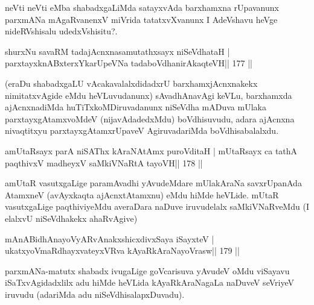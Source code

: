 \begin{artha}
neVti neVti eMba shabadxgaLiMda satayxvAda barxhamxna rUpavanunx parxmANa mAgaRvanenxV miVrida tatatxvXvanunx I AdeVshavu heVge nideRVshisalu udedxVshisitu?.
\end{artha}

\begin{shl}
shurxNu savaRM tadajAcnxnasamutathxsayx niSeVdhataH |
parxtayxknABxterxYkarUpeVNa tadaboVdhanirAkaqteVH\hfill || 177 ||
\end{shl}

\begin{artha}
(eraDu shabadxgaLU vAcakavalalxdidadxrU barxhamxjAcnxnakekx   nimitatxvAgide eMdu heVLuvudanunx) sAvadhAnavAgi keVLu, barxhamxda   ajAcnxnadiMda huTiTxkoMDiruvadanunx niSeVdha mADuva mUlaka   parxtayxgAtamxvoMdeV (nijavAdadedxMdu)  boVdhisuvudu, adara ajAcnxna   nivaqtitxyu parxtayxgAtamxrUpaveV AgiruvadariMda boVdhisabalalxdu.
\end{artha}


\begin{shl}
amUtaRsayx parA niSAThx kAraNAtAmx puroVditaH |
mUtaRsayx ca tathA paqthivxV madheyxV saMkiVNaRtA tayoVH\hfill || 178 ||
\end{shl}

\begin{artha}
amUtaR vasutxgaLige paramAvadhi yAvudeMdare mUlakAraNa savxrUpanAda
AtamxneV (avAyxkaqta ajAcnxtAtamxnu) eMdu hiMde heVLide. mUtaR
vasutxgaLige paqthiviyeMdu averaDara naDuve iruvudelalx saMkiVNaRveMdu
(I elalxvU niSeVdhakekx ahaRvAgive)
\end{artha}


\begin{shl}
mAnABidhAnayoVyARvAnakxshicxdivxSaya iSayxteV |
ukatxyoVmaRdhayxvateyxVRva kAyaRkAraNayoVrasw\hfill || 179 ||
\end{shl}

\begin{artha}
parxmANa-matutx shabadx ivugaLige goVcarisuva yAvudeV oMdu viSayavu iSaTxvAgidadxlilx adu hiMde heVLida kAyaRkAraNagaLa naDuveV seVriyeV iruvudu (adariMda adu niSeVdhisalapxDuvadu).
\end{artha}


